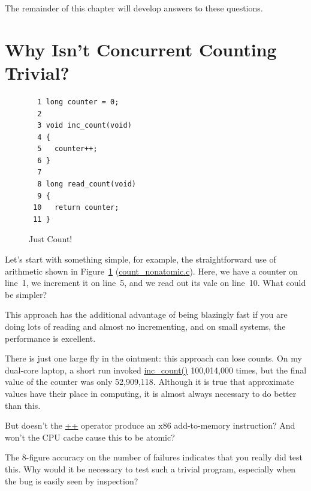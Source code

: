 The remainder of this chapter will develop answers to these questions.

\section{Why Isn't Concurrent Counting Trivial?}
\label{sec:count:Why Isn't Concurrent Counting Trivial?}

\begin{figure}[bp]
{ \scriptsize
\begin{verbatim}
  1 long counter = 0;
  2 
  3 void inc_count(void)
  4 {
  5   counter++;
  6 }
  7 
  8 long read_count(void)
  9 {
 10   return counter;
 11 }
\end{verbatim}
}
\caption{Just Count!}
\label{fig:count:Just Count!}
\end{figure}

Let's start with something simple, for example, the straightforward
use of arithmetic shown in
Figure~\ref{fig:count:Just Count!} (\url{count_nonatomic.c}).
Here, we have a counter on line~1, we increment it on line~5, and we
read out its vale on line~10.
What could be simpler?

This approach has the additional advantage of being blazingly fast if
you are doing lots of reading and almost no incrementing, and on small
systems, the performance is excellent.

There is just one large fly in the ointment: this approach can lose
counts.
On my dual-core laptop, a short run invoked \url{inc_count()}
100,014,000 times, but the final value of the counter was only
52,909,118.
Although it is true that approximate values have their place in computing,
it is almost always necessary to do better than this.

\QuickQuiz{}
	But doesn't the \url{++} operator produce an x86 add-to-memory
	instruction?
	And won't the CPU cache cause this to be atomic?
 \QuickQuizEnd

\QuickQuiz{}
	The 8-figure accuracy on the number of failures indicates
	that you really did test this.
	Why would it be necessary to test such a trivial program,
	especially when the bug is easily seen by inspection?
 \QuickQuizEnd

